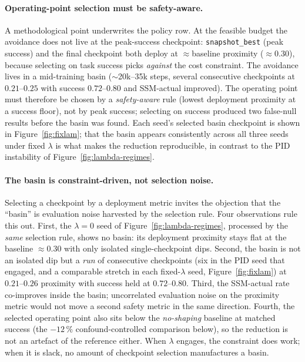 \documentclass[11pt,a4paper]{report}
\newcommand{\ssm}{SSM}
\begin{document}
\paragraph{Operating-point selection must be safety-aware.}
A methodological point underwrites the policy row. At the feasible
budget the avoidance does not live at the peak-success checkpoint:
\texttt{snapshot\_best} (peak success) and the final checkpoint both
deploy at $\approx$baseline proximity ($\approx$0.30), because
selecting on task success picks \emph{against} the cost constraint. The
avoidance lives in a mid-training basin ($\sim$20k--35k steps, several
consecutive checkpoints at $0.21$--$0.25$ with success $0.72$--$0.80$
and \ssm{}-actual improved). The operating point must therefore be
chosen by a \emph{safety-aware} rule (lowest deployment proximity at a
success floor), not by peak success; selecting on success produced two
false-null results before the basin was found. Each seed's selected
basin checkpoint is shown in Figure~\ref{fig:fixlam}; that the basin
appears consistently across all three seeds under fixed $\lambda$ is
what makes the reduction reproducible, in contrast to the PID
instability of Figure~\ref{fig:lambda-regimes}.

\paragraph{The basin is constraint-driven, not selection noise.}
Selecting a checkpoint by a deployment metric invites the objection
that the ``basin'' is evaluation noise harvested by the selection
rule. Four observations rule this out. First, the $\lambda = 0$ seed
of Figure~\ref{fig:lambda-regimes}, processed by the \emph{same}
selection rule, shows no basin: its deployment proximity stays flat
at the baseline $\approx$0.30 with only isolated single-checkpoint
dips. Second, the basin is not an isolated dip but a \emph{run} of
consecutive checkpoints (six in the PID seed that engaged, and a
comparable stretch in each fixed-$\lambda$ seed,
Figure~\ref{fig:fixlam}) at $0.21$--$0.26$ proximity with success
held at $0.72$--$0.80$. Third, the \ssm{}-actual rate co-improves
inside the basin; uncorrelated evaluation noise on the proximity
metric would not move a second safety metric in the same direction.
Fourth, the selected operating point also sits below the
\emph{no-shaping} baseline at matched success (the $-12\,\%$
confound-controlled comparison below), so the reduction is not an
artefact of the reference either. When $\lambda$ engages, the
constraint does work; when it is slack, no amount of checkpoint
selection manufactures a basin.
\end{document}
